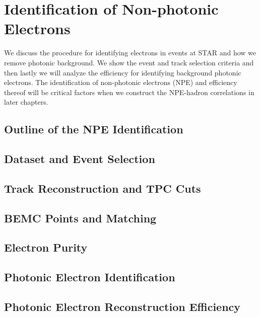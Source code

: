 \chapter{Identification of Non-photonic Electrons}

We discuss the procedure for identifying electrons in events at STAR and how we remove photonic background. We show the event and track selection criteria and then lastly we will analyze the efficiency for identifying background photonic electrons. The identification of non-photonic electrons (NPE) and efficiency thereof will be critical factors when we construct the NPE-hadron correlations in later chapters.

\section{Outline of the NPE Identification}

\section{Dataset and Event Selection}

\section{Track Reconstruction and TPC Cuts}

\section{BEMC Points and Matching}

\section{Electron Purity}

\section{Photonic Electron Identification}

\section{Photonic Electron Reconstruction Efficiency}